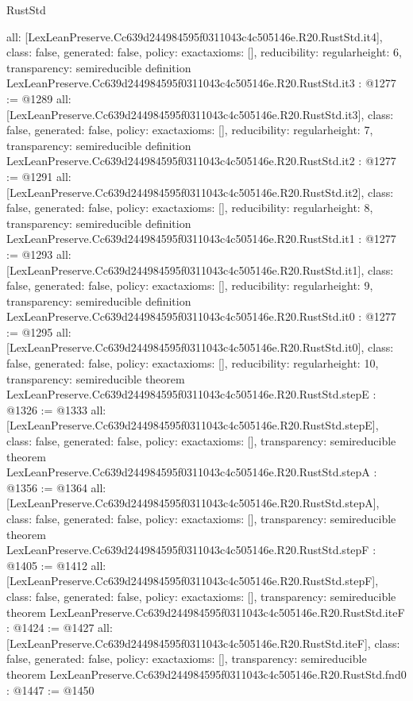 \begin{lexlean}{RustStd}
\begin{coremodule}
{  all: [LexLeanPreserve.Cc639d244984595f0311043c4c505146e.R20.RustStd.it4],
  class: false,
  generated: false,
  policy: exact{axioms: []},
  reducibility: regular{height: 6},
  transparency: semireducible
}
definition LexLeanPreserve.Cc639d244984595f0311043c4c505146e.R20.RustStd.it3 : @1277 := @1289 {
  all: [LexLeanPreserve.Cc639d244984595f0311043c4c505146e.R20.RustStd.it3],
  class: false,
  generated: false,
  policy: exact{axioms: []},
  reducibility: regular{height: 7},
  transparency: semireducible
}
definition LexLeanPreserve.Cc639d244984595f0311043c4c505146e.R20.RustStd.it2 : @1277 := @1291 {
  all: [LexLeanPreserve.Cc639d244984595f0311043c4c505146e.R20.RustStd.it2],
  class: false,
  generated: false,
  policy: exact{axioms: []},
  reducibility: regular{height: 8},
  transparency: semireducible
}
definition LexLeanPreserve.Cc639d244984595f0311043c4c505146e.R20.RustStd.it1 : @1277 := @1293 {
  all: [LexLeanPreserve.Cc639d244984595f0311043c4c505146e.R20.RustStd.it1],
  class: false,
  generated: false,
  policy: exact{axioms: []},
  reducibility: regular{height: 9},
  transparency: semireducible
}
definition LexLeanPreserve.Cc639d244984595f0311043c4c505146e.R20.RustStd.it0 : @1277 := @1295 {
  all: [LexLeanPreserve.Cc639d244984595f0311043c4c505146e.R20.RustStd.it0],
  class: false,
  generated: false,
  policy: exact{axioms: []},
  reducibility: regular{height: 10},
  transparency: semireducible
}
theorem LexLeanPreserve.Cc639d244984595f0311043c4c505146e.R20.RustStd.stepE : @1326 := @1333 {
  all: [LexLeanPreserve.Cc639d244984595f0311043c4c505146e.R20.RustStd.stepE],
  class: false,
  generated: false,
  policy: exact{axioms: []},
  transparency: semireducible
}
theorem LexLeanPreserve.Cc639d244984595f0311043c4c505146e.R20.RustStd.stepA : @1356 := @1364 {
  all: [LexLeanPreserve.Cc639d244984595f0311043c4c505146e.R20.RustStd.stepA],
  class: false,
  generated: false,
  policy: exact{axioms: []},
  transparency: semireducible
}
theorem LexLeanPreserve.Cc639d244984595f0311043c4c505146e.R20.RustStd.stepF : @1405 := @1412 {
  all: [LexLeanPreserve.Cc639d244984595f0311043c4c505146e.R20.RustStd.stepF],
  class: false,
  generated: false,
  policy: exact{axioms: []},
  transparency: semireducible
}
theorem LexLeanPreserve.Cc639d244984595f0311043c4c505146e.R20.RustStd.iteF : @1424 := @1427 {
  all: [LexLeanPreserve.Cc639d244984595f0311043c4c505146e.R20.RustStd.iteF],
  class: false,
  generated: false,
  policy: exact{axioms: []},
  transparency: semireducible
}
theorem LexLeanPreserve.Cc639d244984595f0311043c4c505146e.R20.RustStd.fnd0 : @1447 := @1450 {
}
\end{coremodule}
\end{lexlean}
